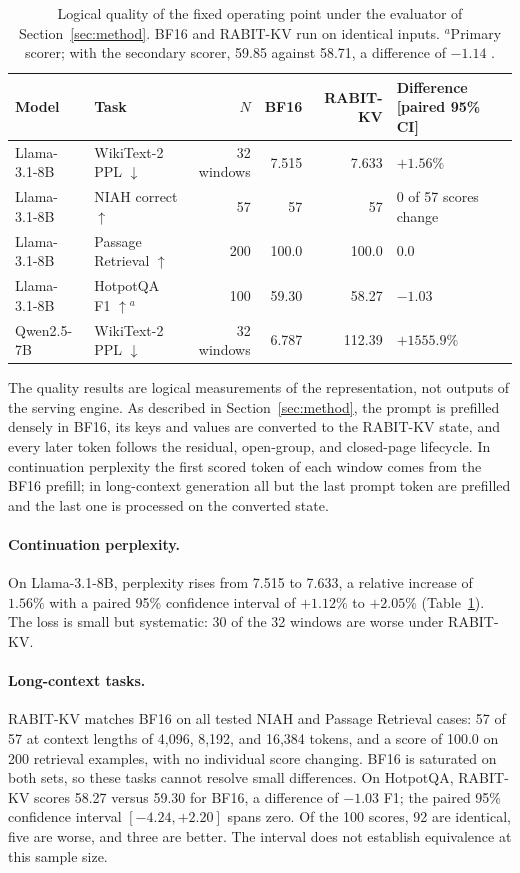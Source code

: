 \documentclass{article}
\begin{document}
\begin{table}[t]
\centering
\small
\setlength{\tabcolsep}{5pt}
\begin{tabular}{@{}llrrrl@{}}
\toprule
Model & Task & $N$ & BF16 & RABIT-KV & Difference [paired 95\% CI] \\
\midrule
Llama-3.1-8B & WikiText-2 PPL $\downarrow$ & 32 windows & 7.515 & 7.633 & $+1.56\%$ \;[$+1.12\%$, $+2.05\%$] \\
Llama-3.1-8B & NIAH correct $\uparrow$ & 57 & 57 & 57 & 0 of 57 scores change \\
Llama-3.1-8B & Passage Retrieval $\uparrow$ & 200 & 100.0 & 100.0 & $0.0$ \;[$0.0$, $0.0$] \\
Llama-3.1-8B & HotpotQA F1 $\uparrow$$^{a}$ & 100 & 59.30 & 58.27 & $-1.03$ \;[$-4.24$, $+2.20$] \\
Qwen2.5-7B & WikiText-2 PPL $\downarrow$ & 32 windows & 6.787 & 112.39 & $+1555.9\%$ \;[$+1320\%$, $+1828\%$] \\
\bottomrule
\end{tabular}
\caption{Logical quality of the fixed operating point under the evaluator of Section~\ref{sec:method}.
BF16 and RABIT-KV run on identical inputs. $^{a}$Primary scorer; with the secondary scorer, 59.85
against 58.71, a difference of $-1.14$ \;[$-4.30$, $+2.03$].}
\label{tab:quality}
\end{table}

The quality results are logical measurements of the representation, not outputs of the serving engine.
As described in Section~\ref{sec:method}, the prompt is prefilled densely in BF16, its keys and values
are converted to the RABIT-KV state, and every later token follows the residual, open-group, and
closed-page lifecycle. In continuation perplexity the first scored token of each window comes from the
BF16 prefill; in long-context generation all but the last prompt token are prefilled and the last one
is processed on the converted state.

\paragraph{Continuation perplexity.}
On Llama-3.1-8B, perplexity rises from 7.515 to 7.633, a relative increase of $1.56\%$ with a paired
95\% confidence interval of $+1.12\%$ to $+2.05\%$ (Table~\ref{tab:quality}). The loss is small but
systematic: 30 of the 32 windows are worse under RABIT-KV.

\paragraph{Long-context tasks.}
RABIT-KV matches BF16 on all tested NIAH and Passage Retrieval cases: 57 of 57 at context lengths of
4,096, 8,192, and 16,384 tokens, and a score of 100.0 on 200 retrieval examples, with no individual
score changing. BF16 is saturated on both sets, so these tasks cannot resolve small differences. On
HotpotQA, RABIT-KV scores 58.27 versus 59.30 for BF16, a difference of $-1.03$ F1; the paired 95\%
confidence interval $[-4.24, +2.20]$ spans zero. Of the 100 scores, 92 are identical, five are worse,
and three are better. The interval does not establish equivalence at this sample size.
\end{document}
